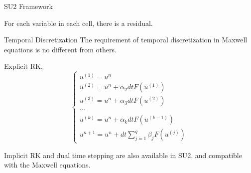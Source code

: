 \begin{frame}{SU2 Framework}

For each variable in each cell, there is a residual.
\end{frame}



\begin{frame}{Temporal Discretization}
The requirement of temporal discretization in Maxwell equations is no different from others.

Explicit RK,
\begin{equation}
\left\{\begin{array}{l}{u^{(1)}=u^{n}} \\ {u^{(2)}=u^{n}+\alpha_{2} d t F\left(u^{(1)}\right)} \\ {u^{(3)}=u^{n}+\alpha_{3} d t F\left(u^{(2)}\right)} \\ {\cdots} \\ {u^{(k)}=u^{n}+\alpha_{k} d t F\left(u^{(k-1)}\right)} \\ {u^{n+1}=u^{n}+d t \sum_{j=1}^{q} \beta_{j} F\left(u^{(j)}\right)}\end{array}\right.
\end{equation}

Implicit RK and dual time stepping \parencite{SU2LiDualTime} are also available in SU2, and compatible with the Maxwell equations.
\end{frame}





    
